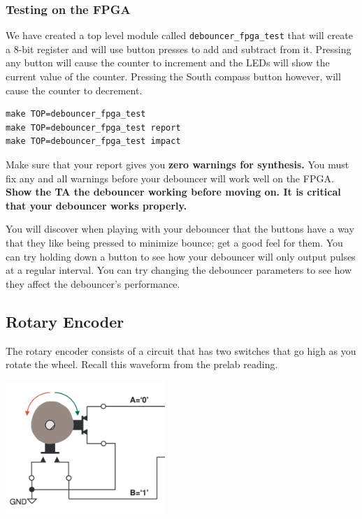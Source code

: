\documentclass[11pt]{article}
\begin{document}
\subsubsection{Testing on the FPGA}
We have created a top level module called \verb|debouncer_fpga_test| that will create a 8-bit register and will use button presses to add and subtract from it. Pressing any button will cause the counter to increment and the LEDs will show the current value of the counter. Pressing the South compass button however, will cause the counter to decrement. 

\begin{verbatim}
make TOP=debouncer_fpga_test
make TOP=debouncer_fpga_test report
make TOP=debouncer_fpga_test impact
\end{verbatim} 

Make sure that your report gives you \textbf{zero warnings for synthesis.} You must fix any and all warnings before your debouncer will work well on the FPGA.\\

\textbf{Show the TA the debouncer working before moving on. It is critical that your debouncer works properly.}

You will discover when playing with your debouncer that the buttons have a way that they like being pressed to minimize bounce; get a good feel for them. You can try holding down a button to see how your debouncer will only output pulses at a regular interval. You can try changing the debouncer parameters to see how they affect the debouncer's performance.

\subsection{Rotary Encoder}

The rotary encoder consists of a circuit that has two switches that go high as you rotate the wheel. Recall this waveform from the prelab reading.

\begin{center}
\includegraphics[height=5cm]{images/lab2_fig5.png}
\end{center}
\end{document}
